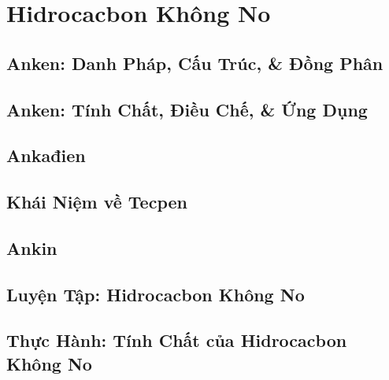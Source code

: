 \documentclass[oneside]{book}
\numberwithin{equation}{section}
\begin{document}

\chapter{Hidrocacbon Không No}

\section{Anken: Danh Pháp, Cấu Trúc, \& Đồng Phân}


\section{Anken: Tính Chất, Điều Chế, \& Ứng Dụng}


\section{Ankađien}


\section{Khái Niệm về Tecpen}


\section{Ankin}


\section{Luyện Tập: Hidrocacbon Không No}


\section{Thực Hành: Tính Chất của Hidrocacbon Không No}
\end{document}
